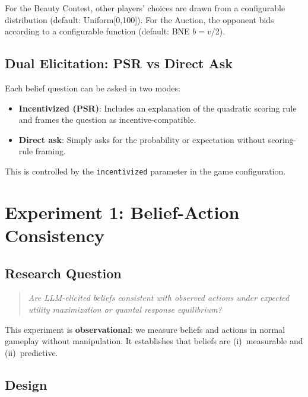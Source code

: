 \documentclass[12pt]{article}
\begin{document}
For the Beauty Contest, other players' choices are drawn from a configurable distribution (default: Uniform[0,100]). For the Auction, the opponent bids according to a configurable function (default: BNE $b = v/2$).


\subsection{Dual Elicitation: PSR vs Direct Ask}
\label{sec:dual}

Each belief question can be asked in two modes:
\begin{itemize}[nosep]
    \item \textbf{Incentivized (PSR)}: Includes an explanation of the quadratic scoring rule and frames the question as incentive-compatible.
    \item \textbf{Direct ask}: Simply asks for the probability or expectation without scoring-rule framing.
\end{itemize}

This is controlled by the \texttt{incentivized} parameter in the game configuration.


\section{Experiment 1: Belief-Action Consistency}
\label{sec:exp1}

\subsection{Research Question}

\begin{quote}
\emph{Are LLM-elicited beliefs consistent with observed actions under expected utility maximization or quantal response equilibrium?}
\end{quote}

This experiment is \textbf{observational}: we measure beliefs and actions in normal gameplay without manipulation. It establishes that beliefs are (i)~measurable and (ii)~predictive.

\subsection{Design}
\end{document}
